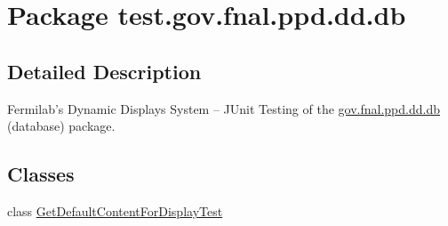 \hypertarget{namespacetest_1_1gov_1_1fnal_1_1ppd_1_1dd_1_1db}{\section{Package test.\-gov.\-fnal.\-ppd.\-dd.\-db}
\label{namespacetest_1_1gov_1_1fnal_1_1ppd_1_1dd_1_1db}
}


\subsection{Detailed Description}
Fermilab's Dynamic Displays System -- J\-Unit Testing of the \hyperlink{namespacetest_1_1gov_1_1fnal_1_1ppd_1_1dd_1_1db}{gov.\-fnal.\-ppd.\-dd.\-db} (database) package.\subsection*{Classes}
\begin{DoxyCompactItemize}
\item 
class \hyperlink{classtest_1_1gov_1_1fnal_1_1ppd_1_1dd_1_1db_1_1GetDefaultContentForDisplayTest}{Get\-Default\-Content\-For\-Display\-Test}
\end{DoxyCompactItemize}
